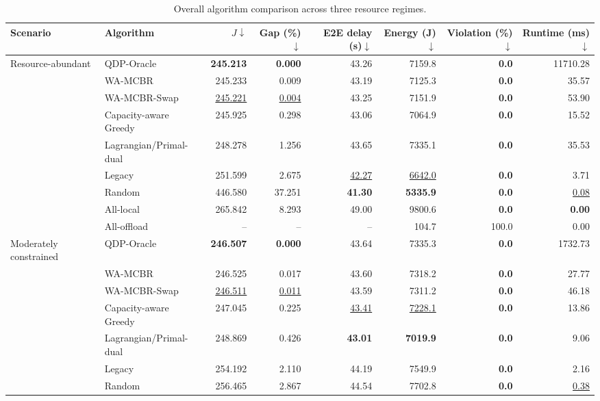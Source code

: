 \begin{table}[t]
\centering
\caption{Overall algorithm comparison across three resource regimes.}
\label{tab:overall_algorithm_comparison}
\setlength{\tabcolsep}{4pt}
\small
\begin{tabular}{llrrrrrr}
\toprule
Scenario & Algorithm & $J\downarrow$ & Gap (\%)$\downarrow$ & E2E delay (s)$\downarrow$ & Energy (J)$\downarrow$ & Violation (\%)$\downarrow$ & Runtime (ms)$\downarrow$ \\
\midrule
Resource-abundant & QDP-Oracle & \textbf{245.213} & \textbf{0.000} & 43.26 & 7159.8 & \textbf{0.0} & 11710.28 \\
 & WA-MCBR & 245.233 & 0.009 & 43.19 & 7125.3 & \textbf{0.0} & 35.57 \\
 & WA-MCBR-Swap & \underline{245.221} & \underline{0.004} & 43.25 & 7151.9 & \textbf{0.0} & 53.90 \\
 & Capacity-aware Greedy & 245.925 & 0.298 & 43.06 & 7064.9 & \textbf{0.0} & 15.52 \\
 & Lagrangian/Primal-dual & 248.278 & 1.256 & 43.65 & 7335.1 & \textbf{0.0} & 35.53 \\
 & Legacy & 251.599 & 2.675 & \underline{42.27} & \underline{6642.0} & \textbf{0.0} & 3.71 \\
 & Random & 446.580 & 37.251 & \textbf{41.30} & \textbf{5335.9} & \textbf{0.0} & \underline{0.08} \\
 & All-local & 265.842 & 8.293 & 49.00 & 9800.6 & \textbf{0.0} & \textbf{0.00} \\
 & All-offload & -- & -- & -- & 104.7 & 100.0 & 0.00 \\
\midrule
Moderately constrained & QDP-Oracle & \textbf{246.507} & \textbf{0.000} & 43.64 & 7335.3 & \textbf{0.0} & 1732.73 \\
 & WA-MCBR & 246.525 & 0.017 & 43.60 & 7318.2 & \textbf{0.0} & 27.77 \\
 & WA-MCBR-Swap & \underline{246.511} & \underline{0.011} & 43.59 & 7311.2 & \textbf{0.0} & 46.18 \\
 & Capacity-aware Greedy & 247.045 & 0.225 & \underline{43.41} & \underline{7228.1} & \textbf{0.0} & 13.86 \\
 & Lagrangian/Primal-dual & 248.869 & 0.426 & \textbf{43.01} & \textbf{7019.9} & \textbf{0.0} & 9.06 \\
 & Legacy & 254.192 & 2.110 & 44.19 & 7549.9 & \textbf{0.0} & 2.16 \\
 & Random & 256.465 & 2.867 & 44.54 & 7702.8 & \textbf{0.0} & \underline{0.38} \\

\end{tabular}
\end{table}
